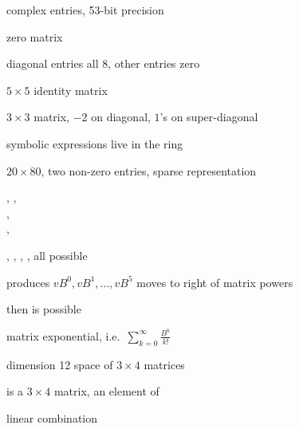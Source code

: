\documentclass[a4paper]{article}
\begin{document}
\begin{multicols*}{3}
 \BreakLineAndIndent
complex entries, 53-bit precision

zero matrix 

  \BreakLineAndIndent
diagonal entries all $8$, other entries zero

$5\times 5$ identity matrix

   \BreakLineAndIndent
$3\times 3$ matrix, $-2$ on diagonal, $1$'s on super-diagonal

 \BreakLineAndIndent
symbolic expressions live in the ring 

  \BreakLineAndIndent
$20\times 80$, two non-zero entries, sparse representation


, , \\
,\\
,

,\quad
{},\quad
{},\quad
{},\quad
{} all possible

  produces $vB^0, vB^1,\dots, vB^5$  \BreakLineAndIndent
{} moves  to right of matrix powers

 then  is possible

 matrix exponential, i.e.\ $\sum_{k=0}^{\infty}\frac{B^k}{k!}$


  \BreakLineAndIndent
dimension 12 space of $3\times 4$ matrices

 \BreakLineAndIndent
is a $3\times 4$ matrix, an element of 





 linear combination


\end{multicols*}
\end{document}
